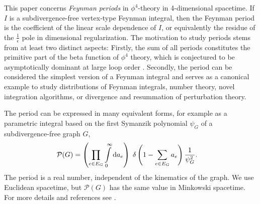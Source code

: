 \documentclass[11pt]{scrartcl}
\numberwithin{equation}{section}
\renewcommand{\d}{\textnormal{d}}
\newcommand{\period}{\mathcal P}
\begin{document}
This paper concerns \emph{Feynman periods} \cite{broadhurst_knots_1995,schnetz_quantum_2010} in $\phi^4$-theory in 4-dimensional spacetime. If $I$ is a subdivergence-free vertex-type Feynman integral, then the Feynman period is the coefficient of the linear scale dependence of $I$, or equivalently the residue of the $\frac 1 \epsilon$ pole in dimensional regularization.
The motivation to study periods stems from at least two distinct aspects: Firstly, the sum of all periods constitutes the primitive part of the beta function of $\phi^4$ theory, which is conjectured to be asymptotically dominant at large loop order \cite{brezin_perturbation_1977,mckane_nonperturbative_1984}. Secondly, the period can be considered the simplest version of a Feynman integral and serves as a canonical example to study distributions of Feynman integrals, number theory, novel integration algorithms, or divergence and resummation of perturbation theory.  

The period can be expressed in many equivalent forms, for example as a parametric integral based on the first Symanzik polynomial $\psi_G$ of a subdivergence-free graph $G$,
\begin{align}\label{def:period}
	\period (G)&=  \left( \prod_{e\in E_G} \int \limits_0^\infty \d a_e  \right)   \; \delta \left( 1-\sum_{e\in E_G}  a_e \right) \frac{1} {\psi_G^{ 2}}.
\end{align} 
The period is a real number, independent of the kinematics of the graph. We use Euclidean spacetime, but $\period(G)$ has the same value in Minkowski spacetime. For more details and references see \cite{schnetz_quantum_2010,kompaniets_minimally_2017,schnetz_numbers_2018,balduf_statistics_2023}. 
\end{document}
